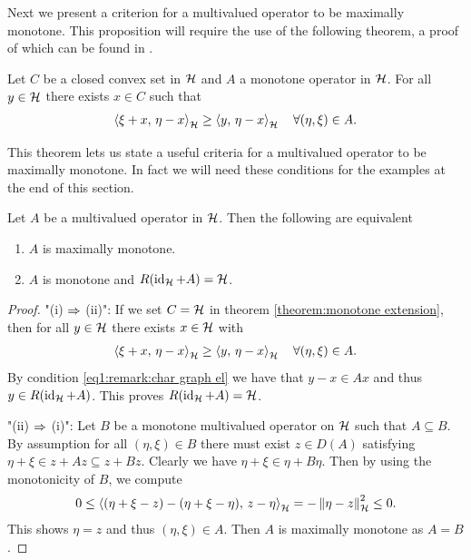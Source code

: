 Next we present a criterion for a multivalued operator to be
maximally monotone. This proposition will require the use of the
following theorem, a proof of which can be found in 
\cite[Theorem 2.1]{brezis1973ope}.

\begin{theorem}\label{theorem:monotone extension}
	Let $ C $ be a closed convex set in $ \mathcal{H} $ and $ A $ a monotone operator in $ \mathcal{H} $.
	For all $ y \in \mathcal{H} $ there exists $ x\in C $ such that
	\begin{align*}
		\left\langle \xi + x,\,\eta - x\right\rangle_{\mathcal{H}}\geq \left\langle y,\,\eta - x\right\rangle_{\mathcal{H}}
		\quad \forall (\eta,\xi) \in A.
	\end{align*}
\end{theorem}

This theorem lets us state a useful 
criteria for a multivalued operator to be maximally monotone.
In fact we will need these conditions for the examples at the end of this section.

\begin{proposition}\label{proposition:criteria for max mon}
	Let $ A $ be a multivalued operator in $ \mathcal{H} $. Then the following
	are equivalent
	\begin{enumerate}[label=(\roman*)]
		\item $ A $ is maximally monotone.
		\item $ A $ is monotone and $ R(\operatorname{\mathrm{id}}_{\mathcal{H}} + A)=\mathcal{H} $.
	\end{enumerate}
\end{proposition}
\begin{proof}
	"(i) $\Rightarrow$ (ii)":  
	If we set $ C=\mathcal{H} $ in theorem \ref{theorem:monotone extension}, 
	then for all $ y\in\mathcal{H} $ there exists $ x\in\mathcal{H} $ with
	\begin{align*}
		\left\langle \xi + x,\,\eta - x\right\rangle_{\mathcal{H}}\geq \left\langle y,\,\eta - x\right\rangle_{\mathcal{H}}
		\quad \forall (\eta,\xi) \in A.
	\end{align*}
	By condition \eqref{eq1:remark:char graph el} we have
	that $ y-x\in Ax $ and thus
	$ y\in R(\operatorname{\mathrm{id}}_{\mathcal{H}}+ A) $. This proves $ R(\operatorname{\mathrm{id}}_{\mathcal{H}}+A)=\mathcal{H} $.\smallskip
	
	"(ii) $\Rightarrow$ (i)": Let $ B $ be a monotone multivalued operator 
	on $ \mathcal{H} $ such that $ A\subseteq B $. By assumption for all 
	$ (\eta,\xi)\in B $ 
	there must exist $ z\in D(A) $ satisfying 
	$ \eta+\xi\in z+Az \subseteq z+Bz $. Clearly we have 
	$ \eta+\xi\in \eta+B\eta $.
	Then by using the monotonicity of $ B $, we compute
	\begin{align*}
		0\leq \left\langle (\eta+\xi-z)-(\eta+\xi-\eta),\,z-\eta\right\rangle_{\mathcal{H}}=-\left\Vert \eta-z\right\Vert_{\mathcal{H}}^2\leq 0.
	\end{align*}
	This shows $ \eta = z $ and thus $ (\eta,\xi)\in A $. Then 
	$ A $ is maximally monotone as $ A=B $.\smallskip
\end{proof}

